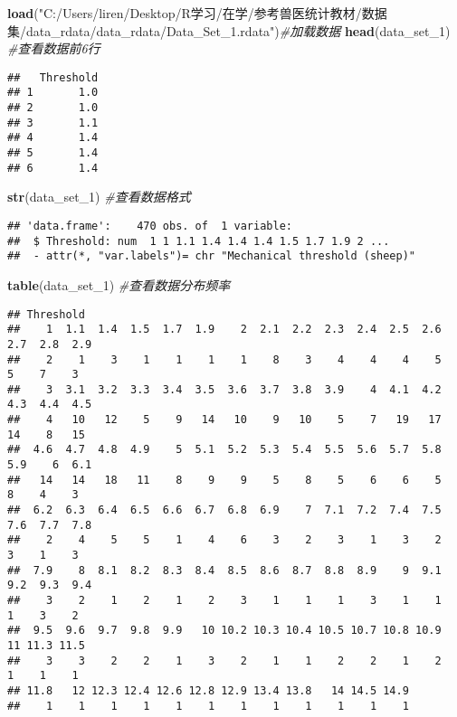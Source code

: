 \documentclass[
]{book}
\newenvironment{Shaded}{\begin{snugshade}}{\end{snugshade}}
\newcommand{\CommentTok}[1]{\textcolor[rgb]{0.56,0.35,0.01}{\textit{#1}}}
\newcommand{\FunctionTok}[1]{\textcolor[rgb]{0.13,0.29,0.53}{\textbf{#1}}}
\newcommand{\NormalTok}[1]{#1}
\newcommand{\StringTok}[1]{\textcolor[rgb]{0.31,0.60,0.02}{#1}}
\theoremstyle{definition}
\theoremstyle{definition}
\theoremstyle{definition}
\theoremstyle{definition}
\theoremstyle{remark}
\begin{document}
\begin{Shaded}
\begin{Highlighting}[]
\FunctionTok{load}\NormalTok{(}\StringTok{"C:/Users/liren/Desktop/R学习/在学/参考兽医统计教材/数据集/data\_rdata/data\_rdata/Data\_Set\_1.rdata"}\NormalTok{)}\CommentTok{\#加载数据}
\FunctionTok{head}\NormalTok{(data\_set\_1) }\CommentTok{\#查看数据前6行}
\end{Highlighting}
\end{Shaded}

\begin{verbatim}
##   Threshold
## 1       1.0
## 2       1.0
## 3       1.1
## 4       1.4
## 5       1.4
## 6       1.4
\end{verbatim}

\begin{Shaded}
\begin{Highlighting}[]
\FunctionTok{str}\NormalTok{(data\_set\_1) }\CommentTok{\#查看数据格式}
\end{Highlighting}
\end{Shaded}

\begin{verbatim}
## 'data.frame':    470 obs. of  1 variable:
##  $ Threshold: num  1 1 1.1 1.4 1.4 1.4 1.5 1.7 1.9 2 ...
##  - attr(*, "var.labels")= chr "Mechanical threshold (sheep)"
\end{verbatim}

\begin{Shaded}
\begin{Highlighting}[]
\FunctionTok{table}\NormalTok{(data\_set\_1) }\CommentTok{\#查看数据分布频率}
\end{Highlighting}
\end{Shaded}

\begin{verbatim}
## Threshold
##    1  1.1  1.4  1.5  1.7  1.9    2  2.1  2.2  2.3  2.4  2.5  2.6  2.7  2.8  2.9 
##    2    1    3    1    1    1    1    8    3    4    4    4    5    5    7    3 
##    3  3.1  3.2  3.3  3.4  3.5  3.6  3.7  3.8  3.9    4  4.1  4.2  4.3  4.4  4.5 
##    4   10   12    5    9   14   10    9   10    5    7   19   17   14    8   15 
##  4.6  4.7  4.8  4.9    5  5.1  5.2  5.3  5.4  5.5  5.6  5.7  5.8  5.9    6  6.1 
##   14   14   18   11    8    9    9    5    8    5    6    6    5    8    4    3 
##  6.2  6.3  6.4  6.5  6.6  6.7  6.8  6.9    7  7.1  7.2  7.4  7.5  7.6  7.7  7.8 
##    2    4    5    5    1    4    6    3    2    3    1    3    2    3    1    3 
##  7.9    8  8.1  8.2  8.3  8.4  8.5  8.6  8.7  8.8  8.9    9  9.1  9.2  9.3  9.4 
##    3    2    1    2    1    2    3    1    1    1    3    1    1    1    3    2 
##  9.5  9.6  9.7  9.8  9.9   10 10.2 10.3 10.4 10.5 10.7 10.8 10.9   11 11.3 11.5 
##    3    3    2    2    1    3    2    1    1    2    2    1    2    1    1    1 
## 11.8   12 12.3 12.4 12.6 12.8 12.9 13.4 13.8   14 14.5 14.9 
##    1    1    1    1    1    1    1    1    1    1    1    1
\end{verbatim}
\end{document}
